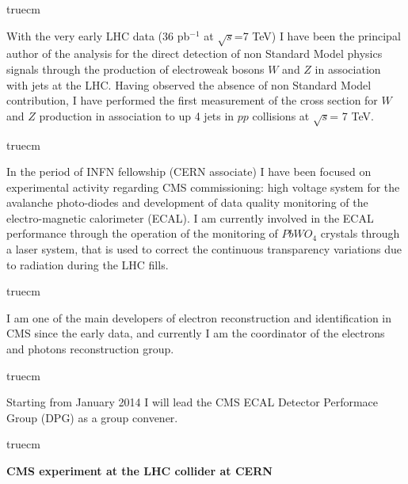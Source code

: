 \documentclass[11pt,twoside,a4paper]{article}
\begin{document}
 truecm

With the very early LHC data (36 pb$^{-1}$ at $\sqrt{s}$=7 TeV) I have
been the principal author of the analysis for the direct
detection of non Standard Model physics signals through the production
of electroweak bosons $W$ and $Z$ in association with jets at the
LHC. Having observed the absence of non Standard Model contribution, I
have performed the first measurement of the cross section for $W$ and
$Z$ production in association to up 4 jets in $pp$ collisions at
$\sqrt{s}$= 7 TeV.

 truecm

In the period of INFN fellowship (CERN associate) I have been focused
on experimental activity regarding CMS commissioning: high voltage
system for the avalanche photo-diodes and development of data quality
monitoring of the electro-magnetic calorimeter (ECAL). I am currently
involved in the ECAL performance through the operation of the
monitoring of $PbWO_4$ crystals through a laser system, that is used
to correct the continuous transparency variations due to radiation
during the LHC fills.

 truecm

I am one of the main developers of electron reconstruction and
identification in CMS since the early data, and currently I am
the coordinator of the electrons and photons reconstruction group.

 truecm

Starting from January 2014 I will lead the CMS ECAL Detector
Performace Group (DPG) as a group convener.

 truecm



\newpage

\begin{center}
  {\bf CMS experiment at the LHC collider at CERN}
\end{center}
\end{document}
